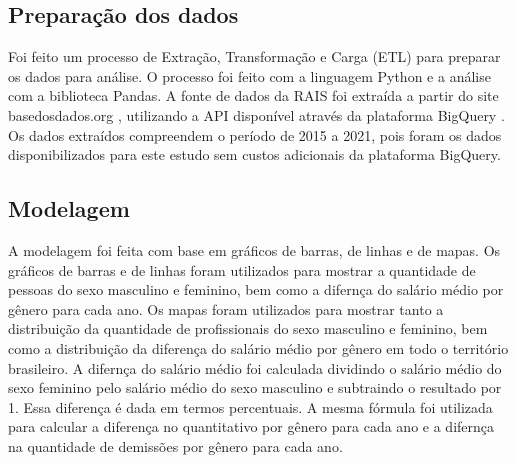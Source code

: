 \subsection{Preparação dos dados}

Foi feito um processo de Extração, Transformação e Carga (ETL) para preparar os dados para análise. O processo foi feito com a linguagem Python e a análise com a biblioteca Pandas. A fonte de dados da RAIS foi extraída a partir do site basedosdados.org \cite{basedosdados}, utilizando a API disponível através da plataforma BigQuery \cite{bigquery}. Os dados extraídos compreendem o período de 2015 a 2021, pois foram os dados disponibilizados para este estudo sem custos adicionais da plataforma BigQuery. 

\subsection{Modelagem}

A modelagem foi feita com base em gráficos de barras, de linhas e de mapas. Os gráficos de barras e de linhas foram utilizados para mostrar a quantidade de pessoas do sexo masculino e feminino, bem como a difernça do salário médio por gênero para cada ano. Os mapas foram utilizados para mostrar tanto a distribuição da quantidade de profissionais do sexo masculino e feminino, bem como a distribuição da diferença do salário médio por gênero em todo o território brasileiro. A difernça do salário médio foi calculada dividindo o salário médio do sexo feminino pelo salário médio do sexo masculino e subtraindo o resultado por 1. Essa diferença é dada em termos percentuais. A mesma fórmula foi utilizada para calcular a diferença no quantitativo por gênero para cada ano e a difernça na quantidade de demissões por gênero para cada ano.

